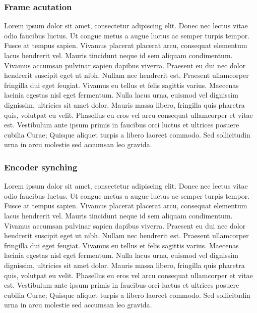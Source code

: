 \documentclass{article}
\begin{document}
\subsubsection{Frame acutation}
Lorem ipsum dolor sit amet, consectetur adipiscing elit. Donec nec lectus vitae odio faucibus luctus. Ut congue metus a augue luctus ac semper turpis tempor. Fusce at tempus sapien. Vivamus placerat placerat arcu, consequat elementum lacus hendrerit vel. Mauris tincidunt neque id sem aliquam condimentum. Vivamus accumsan pulvinar sapien dapibus viverra. Praesent eu dui nec dolor hendrerit suscipit eget ut nibh. Nullam nec hendrerit est. Praesent ullamcorper fringilla dui eget feugiat. Vivamus eu tellus et felis sagittis varius. Maecenas lacinia egestas nisl eget fermentum. Nulla lacus urna, euismod vel dignissim dignissim, ultricies sit amet dolor. Mauris massa libero, fringilla quis pharetra quis, volutpat eu velit. Phasellus eu eros vel arcu consequat ullamcorper et vitae est. Vestibulum ante ipsum primis in faucibus orci luctus et ultrices posuere cubilia Curae; Quisque aliquet turpis a libero laoreet commodo. Sed sollicitudin urna in arcu molestie sed accumsan leo gravida.


\subsubsection{Encoder synching}
Lorem ipsum dolor sit amet, consectetur adipiscing elit. Donec nec lectus vitae odio faucibus luctus. Ut congue metus a augue luctus ac semper turpis tempor. Fusce at tempus sapien. Vivamus placerat placerat arcu, consequat elementum lacus hendrerit vel. Mauris tincidunt neque id sem aliquam condimentum. Vivamus accumsan pulvinar sapien dapibus viverra. Praesent eu dui nec dolor hendrerit suscipit eget ut nibh. Nullam nec hendrerit est. Praesent ullamcorper fringilla dui eget feugiat. Vivamus eu tellus et felis sagittis varius. Maecenas lacinia egestas nisl eget fermentum. Nulla lacus urna, euismod vel dignissim dignissim, ultricies sit amet dolor. Mauris massa libero, fringilla quis pharetra quis, volutpat eu velit. Phasellus eu eros vel arcu consequat ullamcorper et vitae est. Vestibulum ante ipsum primis in faucibus orci luctus et ultrices posuere cubilia Curae; Quisque aliquet turpis a libero laoreet commodo. Sed sollicitudin urna in arcu molestie sed accumsan leo gravida.
\end{document}
